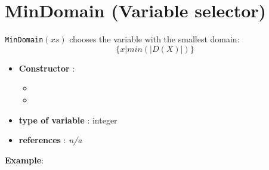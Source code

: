 \section{MinDomain (Variable selector)}\label{mindomain:mindomainvarselector}\hypertarget{mindomain:mindomainvarselector}{}
\begin{notedef}
  \texttt{MinDomain}$(xs)$ chooses the variable with the smallest domain:
$$\{x | min(|D(X)|)\}$$
\end{notedef}

\begin{itemize}
	\item \textbf{Constructor} : 
	\begin{itemize}
	\item {}
	\item {}
	\end{itemize}	
	\item \textbf{type of variable} : integer
	\item \textbf{references} : \emph{n/a}
\end{itemize}

\textbf{Example}:
%

